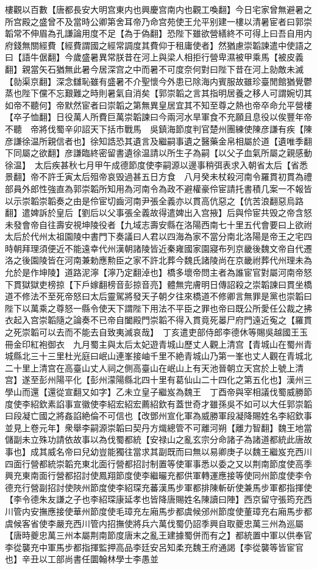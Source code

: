 樓觀以百數【唐都長安大明宫東内也興慶宫南内也觀工喚翻】今日宅家曾無避暑之所宫殿之盛曾不及當時公卿第舍耳帝乃命宫苑使王允平别建一樓以清暑宦者曰郭崇韜常不伸眉為孔謙論用度不足【為于偽翻】恐陛下雖欲營繕終不可得上曰吾自用内府錢無關經費【經費謂國之經常調度其費仰于租庸使者】然猶慮崇韜諫遣中使語之曰【語牛倨翻】今歲盛暑異常朕昔在河上與梁人相拒行營卑濕被甲乘馬【被皮義翻】親當矢石猶無此暑今居深宫之中而暑不可度奈何對曰陛下昔在河上勍敵未滅【勍渠京翻】深念讎恥雖有盛暑不介聖懷今外患已除海内賓服故雖珍臺閒館猶覺鬱蒸也陛下儻不忘艱難之時則暑氣自消矣【郭崇韜之言其指明居養之移人可謂婉切其如帝不聽何】帝默然宦者曰崇韜之第無異皇居宜其不知至尊之熱也帝卒命允平營樓【卒子恤翻】日役萬人所費巨萬崇韜諫曰今兩河水旱軍食不充願且息役以俟豐年帝不聽　帝將伐蜀辛卯詔天下括市戰馬　吳鎮海節度判官楚州團練使陳彦謙有疾【陳彦謙徐温所親信者也】徐知誥恐其遺言及繼嗣事遺之醫藥金帛相屬於道【遺唯季翻下同屬之欲翻】彦謙臨終密留書遺徐温請以所生子為嗣【以父子血氣所屬之親感動徐温】　太后疾甚秋七月甲午成德節度使李嗣源以邊事稍弭表求入朝省太后【省悉景翻】帝不許壬寅太后殂帝哀毁過甚五日方食　八月癸未杖殺河南令羅貫初貫為禮部員外郎性強直為郭崇韜所知用為河南令為政不避權豪伶宦請托書積几案一不報皆以示崇韜崇韜奏之由是伶宦切齒河南尹張全義亦以貫高伉惡之【伉苦浪翻惡烏路翻】遣婢訴於皇后【劉后以父事張全義故得遣婢出入宫掖】后與伶宦共毁之帝含怒未發會帝自往壽安視坤陵役者【九域志壽安縣在洛陽西南七十里五代會要曰上欲祔太后於代州太祖園陵中書門下奏議曰人君以四海為家不當分南北洛陽是帝王之宅四時朝拜理須便近不能遠幸代州漢朝諸陵皆近秦雍國家園寢布列京畿後魏文帝自代遷洛之後園陵皆在河南兼勅應勲臣之家不許北葬今魏氏諸陵尚在京畿祔葬代州理未為允於是作坤陵】道路泥濘【濘乃定翻淖也】橋多壞帝問主者為誰宦官對屬河南帝怒下貫獄獄吏榜掠【下戶嫁翻榜音彭掠音亮】體無完膚明日傳詔殺之崇韜諫曰貫坐橋道不修法不至死帝怒曰太后靈駕將發天子朝夕往來橋道不修卿言無罪是黨也崇韜曰陛下以萬乘之尊怒一縣令使天下謂陛下用法不平臣之罪也帝曰既公所愛任公裁之拂衣起入宫崇韜隨之論奏不已帝自闔殿門崇韜不得入貫竟死㬥尸府門遠近寃之【羅貫之死崇韜可以去而不能去自致夷滅哀哉】　丁亥遣吏部侍郎李德休等賜吳越國王玉冊金印紅袍御衣　九月蜀主與太后太妃遊青城山歷丈人觀上清宫【青城山在蜀州青城縣北三十三里杜光庭曰岷山連峯接岫千里不絶青城山乃第一峯也丈人觀在青城北二十里上清宫在高臺山丈人祠之側高臺山在岷山上有天池晉朝立天宫於上號上清宫】遂至彭州陽平化【彭州濛陽縣北四十里有葛仙山二十四化之第五化也】漢州三學山而還【還從宣翻又如字】乙未立皇子繼岌為魏王　丁酉帝與宰相議伐蜀威勝節度使李紹欽素諂事宣徽使李紹宏紹宏薦紹欽有蓋世奇才雖孫吳不如可以大任郭崇韜曰段凝亡國之將姦諂絶倫不可信也【改鄧州宣化軍為威勝軍段凝降賜姓名李紹欽事並見上卷元年】衆舉李嗣源崇韜曰契丹方熾總管不可離河朔【離力智翻】魏王地當儲副未立殊功請依故事以為伐蜀都統【安禄山之亂玄宗分命諸子為諸道都統此唐故事也】成其威名帝曰兒幼豈能獨往當求其副既而曰無以易卿庚子以魏王繼岌充西川四面行營都統崇韜充東北面行營都招討制置等使軍事悉以委之又以荆南節度使高季興充東南面行營都招討使鳳翔節度使李繼曮充都供軍轉運應接等使同州節度使李令德充行營副招討使陜州節度使李紹琛充蕃漢馬步軍都排陳斬斫使兼馬步軍都指揮使【李令德朱友謙之子也李紹琛康延孝也皆降唐賜姓名陳讀曰陣】西京留守張筠充西川管内安撫應接使華州節度使毛璋充左廂馬步都虞候邠州節度使董璋充右廂馬步都虞候客省使李嚴充西川管内招撫使將兵六萬伐蜀仍詔季興自取夔忠萬三州為巡屬【唐時夔忠萬三州本屬荆南節度唐末之亂王建據蜀併而有之】都統置中軍以供奉官李從襲充中軍馬步都指揮監押高品李廷安呂知柔充魏王府通謁【李從襲等皆宦官也】辛丑以工部尚書任圜翰林學士李愚並